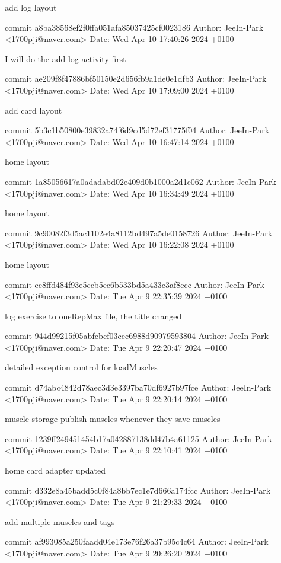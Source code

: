     add log layout

commit a8ba38568ef2f0ffa051afa85037425cf0023186
Author: JeeIn-Park <1700pji@naver.com>
Date:   Wed Apr 10 17:40:26 2024 +0100

    I will do the add log activity first

commit ae209f8f47886bf50150e2d656fb9a1de0e1dfb3
Author: JeeIn-Park <1700pji@naver.com>
Date:   Wed Apr 10 17:09:00 2024 +0100

    add card layout

commit 5b3c1b50800e39832a74f6d9cd5d72ef31775f04
Author: JeeIn-Park <1700pji@naver.com>
Date:   Wed Apr 10 16:47:14 2024 +0100

    home layout

commit 1a85056617a0adadabd02e409d0b1000a2d1e062
Author: JeeIn-Park <1700pji@naver.com>
Date:   Wed Apr 10 16:34:49 2024 +0100

    home layout

commit 9c90082f3d5ac1102e4a8112bd497a5de0158726
Author: JeeIn-Park <1700pji@naver.com>
Date:   Wed Apr 10 16:22:08 2024 +0100

    home layout

commit ec8ffd484f93e5ccb5ec6b533bd5a433c3af8ecc
Author: JeeIn-Park <1700pji@naver.com>
Date:   Tue Apr 9 22:35:39 2024 +0100

    log exercise to oneRepMax file, the title changed

commit 944d99215f05abfcbcf03cec6988d90979593804
Author: JeeIn-Park <1700pji@naver.com>
Date:   Tue Apr 9 22:20:47 2024 +0100

    detailed exception control for loadMuscles

commit d74abc4842d78aec3d3e3397ba70df6927b97fce
Author: JeeIn-Park <1700pji@naver.com>
Date:   Tue Apr 9 22:20:14 2024 +0100

    muscle storage publish muscles whenever they save muscles

commit 1239ff249451454b17a042887138dd47b4a61125
Author: JeeIn-Park <1700pji@naver.com>
Date:   Tue Apr 9 22:10:41 2024 +0100

    home card adapter updated

commit d332e8a45badd5c0f84a8bb7ec1e7d666a174fcc
Author: JeeIn-Park <1700pji@naver.com>
Date:   Tue Apr 9 21:29:33 2024 +0100

    add multiple muscles and tags

commit af993085a250faadd04e173e76f26a37b95c4c64
Author: JeeIn-Park <1700pji@naver.com>
Date:   Tue Apr 9 20:26:20 2024 +0100

